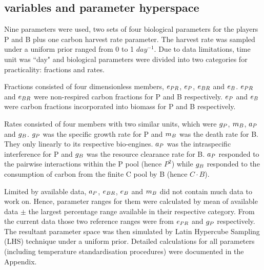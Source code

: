 \documentclass[../thesis.tex]{subfiles} %
\begin{document}
\subsection{variables and parameter hyperspace}
Nine parameters were used, two sets of four biological parameters for the players P and B plus one carbon harvest rate parameter.  The harvest rate was sampled under a uniform prior ranged from 0 to 1 $day^{-1}$.  Due to data limitations, time unit was ``day" and biological parameters were divided into two categories for practicality: fractions and rates.

Fractions consisted of four dimensionless members, $e_{PR}$, $e_P$, $e_{BR}$ and $e_B$.  $e_{PR}$ and $e_{BR}$ were non-respired carbon fractions for P and B respectively.  $e_P$ and $e_B$ were carbon fractions incorporated into biomass for P and B respectively.

Rates consisted of four members with two similar units, which were $g_P$, $m_B$, $a_P$ and $g_B$.  $g_P$ was the specific growth rate for P and $m_B$ was the death rate for B.  They only linearly to its respective bio-engines.  $a_P$ was the intraspecific interference for P and $g_B$ was the resource clearance rate for B.  $a_P$ responded to the pairwise interactions within the P pool (hence $P^2$) while $g_B$ responded to the consumption of carbon from the finite C pool by B (hence $C\cdot B$).

Limited by available data, $a_P$, $e_{BR}$, $e_B$ and $m_B$ did not contain much data to work on.  Hence, parameter ranges for them were calculated by mean of available data $\pm$ the largest percentage range available in their respective category.  From the current data those two reference ranges were from $e_{PR}$ and $g_P$ respectively.  The resultant parameter space was then simulated by Latin Hypercube Sampling (LHS) technique under a uniform prior.  Detailed calculations for all parameters (including temperature standardisation procedures) were documented in the Appendix.
\end{document}
